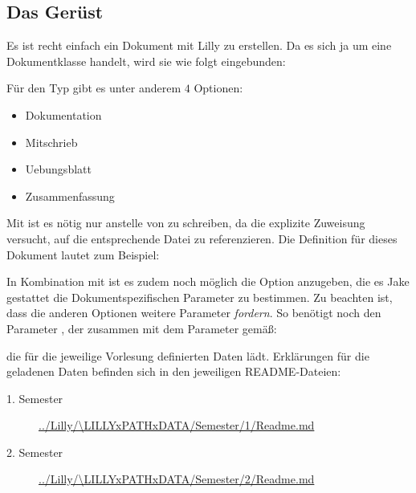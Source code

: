 \subsection{Das Gerüst}
Es ist recht einfach ein Dokument mit Lilly zu erstellen. Da es sich ja um eine Dokumentklasse handelt, wird sie wie folgt eingebunden:
Für den Typ gibt es unter anderem $4$ Optionen:
\begin{multicols}{2}
    \begin{itemize}[label=$\diamond$]\narrowitems
        \item Dokumentation
        \item Mitschrieb
        \item Uebungsblatt
        \item Zusammenfassung
    \end{itemize}
\end{multicols}
Mit  ist es nötig nur  anstelle von  zu schreiben, da die explizite Zuweisung versucht, auf die entsprechende Datei zu referenzieren. Die Definition für dieses Dokument lautet zum Beispiel: %
In Kombination mit \Jake ist es zudem noch möglich die Option  anzugeben, die es Jake gestattet die Dokumentspezifischen Parameter zu bestimmen.\newline
Zu beachten ist, dass die anderen Optionen weitere Parameter \emph{fordern}. \newline
So benötigt  noch den Parameter , der zusammen mit dem Parameter  gemäß:
\begin{latex*}

\end{latex*}
die für die jeweilige Vorlesung definierten Daten lädt.
Erklärungen für die geladenen Daten befinden sich in den jeweiligen README-Dateien:
\begin{description}
    \item[1. Semester] \url{../Lilly/\LILLYxPATHxDATA/Semester/1/Readme.md}
    \item[2. Semester] \url{../Lilly/\LILLYxPATHxDATA/Semester/2/Readme.md}
\end{description}


